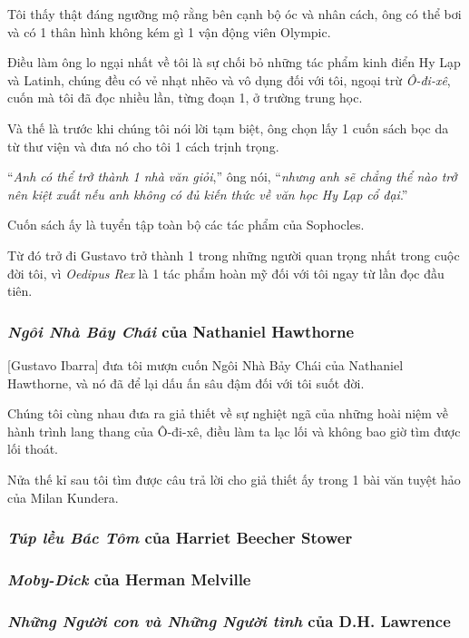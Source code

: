 \documentclass{article}
\begin{document}
Tôi thấy thật đáng ngưỡng mộ rằng bên cạnh bộ óc và nhân cách, ông có thể bơi và có 1 thân hình không kém gì 1 vận động viên Olympic.

Điều làm ông lo ngại nhất về tôi là sự chối bỏ những tác phẩm kinh điển Hy Lạp và Latinh, chúng đều có vẻ nhạt nhẽo và vô dụng đối với tôi, ngoại trừ \textit{Ô-đi-xê}, cuốn mà tôi đã đọc nhiều lần, từng đoạn 1, ở trường trung học.

Và thế là trước khi chúng tôi nói lời tạm biệt, ông chọn lấy 1 cuốn sách bọc da từ thư viện và đưa nó cho tôi 1 cách trịnh trọng.

``\textit{Anh có thể trở thành 1 nhà văn giỏi},'' ông nói, ``\textit{nhưng anh sẽ chẳng thể nào trở nên kiệt xuất nếu anh không có đủ kiến thức về văn học Hy Lạp cổ đại}.''

Cuốn sách ấy là tuyển tập toàn bộ các tác phẩm của Sophocles.

Từ đó trở đi Gustavo trở thành 1 trong những người quan trọng nhất trong cuộc đời tôi, vì \textit{Oedipus Rex} là 1 tác phẩm hoàn mỹ đối với tôi ngay từ lần đọc đầu tiên.

\subsubsection{\textit{Ngôi Nhà Bảy Chái} của Nathaniel Hawthorne}
[Gustavo Ibarra] đưa tôi mượn cuốn Ngôi Nhà Bảy Chái của Nathaniel Hawthorne, và nó đã để lại dấu ấn sâu đậm đối với tôi suốt đời.

Chúng tôi cùng nhau đưa ra giả thiết về sự nghiệt ngã của những hoài niệm về hành trình lang thang của Ô-đi-xê, điều làm ta lạc lối và không bao giờ tìm được lối thoát.

Nửa thế kỉ sau tôi tìm được câu trả lời cho giả thiết ấy trong 1 bài văn tuyệt hảo của Milan Kundera.

\subsubsection{\textit{Túp lều Bác Tôm} của Harriet Beecher Stower}

\subsubsection{\textit{Moby-Dick} của Herman Melville}

\subsubsection{\textit{Những Người con và Những Người tình} của D.H. Lawrence}
\end{document}
